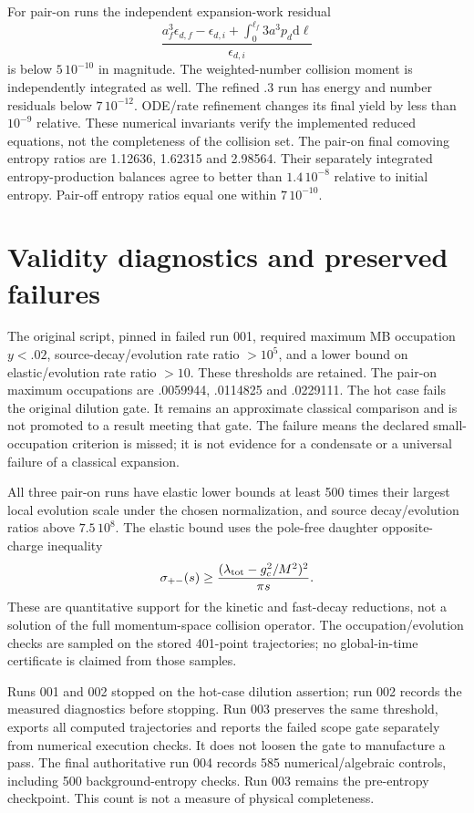 \documentclass[11pt]{article}
\newcommand{\dd}{\mathrm d}
\begin{document}
For pair-on runs the independent expansion-work residual
\begin{equation}
 \frac{a_f^3\epsilon_{d,f}-\epsilon_{d,i}
 +\int_0^{\ell_f}3a^3p_d\dd\ell}{\epsilon_{d,i}}
\end{equation}
is below $5\,10^{-10}$ in magnitude. The weighted-number collision moment
is independently integrated as well. The refined $.3$ run has energy and
number residuals below $7\,10^{-12}$. ODE/rate refinement changes its final
yield by less than $10^{-9}$ relative. These numerical invariants verify
the implemented reduced equations, not the completeness of the collision set.
The pair-on final comoving entropy ratios are 1.12636, 1.62315 and 2.98564.
Their separately integrated entropy-production balances agree to better
than $1.4\,10^{-8}$ relative to initial entropy. Pair-off entropy ratios
equal one within $7\,10^{-10}$.

\section{Validity diagnostics and preserved failures}
The original script, pinned in failed run 001, required maximum MB
occupation $y<.02$, source-decay/evolution rate ratio $>10^5$, and a lower
bound on elastic/evolution rate ratio $>10$. These thresholds are retained.
The pair-on maximum occupations are .0059944, .0114825 and .0229111.
The hot case fails the original dilution gate. It remains an approximate
classical comparison and is not promoted to a result meeting that gate.
The failure means the declared small-occupation criterion is missed; it is
not evidence for a condensate or a universal failure of a classical expansion.

All three pair-on runs have elastic lower bounds at least 500 times their
largest local evolution scale under the chosen normalization, and source
decay/evolution ratios above $7.5\,10^8$. The elastic bound uses the
pole-free daughter opposite-charge inequality
\begin{equation}
 \sigma_{+-}(s)\ge\frac{(\lambda_{\rm tot}-g_c^2/M^2)^2}{\pi s}.
\end{equation}
These are quantitative support for the kinetic and fast-decay reductions,
not a solution of the full momentum-space collision operator. The
occupation/evolution checks are sampled on the stored 401-point trajectories;
no global-in-time certificate is claimed from those samples.

Runs 001 and 002 stopped on the hot-case dilution assertion; run 002 records
the measured diagnostics before stopping. Run 003 preserves the same
threshold, exports all computed trajectories and reports the failed scope
gate separately from numerical execution checks. It does not loosen the
gate to manufacture a pass. The final authoritative run 004 records
585 numerical/algebraic controls, including 500 background-entropy checks.
Run 003 remains the pre-entropy checkpoint. This count is not a
measure of physical completeness.
\end{document}
